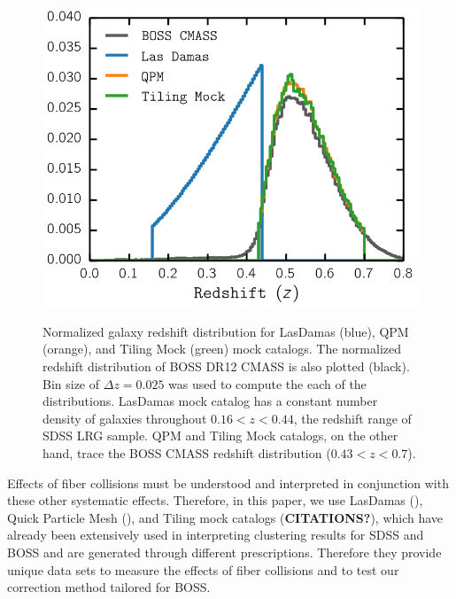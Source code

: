 \documentclass{emulateapj}
\begin{document}
\def \cmasscolor{black}
\def \ldgcolor{blue}
\def \qpmcolor{orange}
\def \tmcolor{green}
\begin{figure}
\begin{center}
\includegraphics[scale=0.45]{fcpaper_z_dist.png} \label{fig:zdist}
\caption{Normalized galaxy redshift distribution for LasDamas (\ldgcolor), QPM (\qpmcolor), and Tiling Mock (\tmcolor) mock catalogs. The normalized redshift distribution of BOSS DR12 CMASS is also plotted (\cmasscolor). Bin size of $\Delta z = 0.025$ was used to compute the each of the distributions. LasDamas mock catalog has a constant number density of galaxies throughout $0.16 < z < 0.44$, the redshift range of SDSS LRG sample. QPM and Tiling Mock catalogs, on the other hand, trace the BOSS CMASS redshift distribution ($0.43 < z < 0.7$).}
\end{center}
\end{figure}

Effects of fiber collisions must be understood and interpreted in conjunction with these other systematic effects. Therefore, in this paper, we use LasDamas (\citealt{McBride:2009aa, McBride:2011aa}), Quick Particle Mesh (\citealt{White:2014aa}), and Tiling mock catalogs ({\bf CITATIONS?}), which have already been extensively used in interpreting clustering results for SDSS and BOSS and are generated through different prescriptions. Therefore they provide unique data sets to measure the effects of fiber collisions and to test our correction method tailored for BOSS. 
\end{document}
